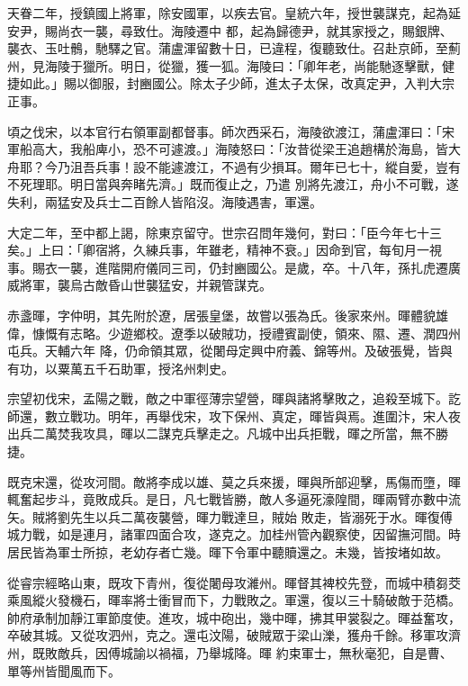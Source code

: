 \begin{pinyinscope}
 天眷二年，授鎮國上將軍，除安國軍，以疾去官。皇統六年，授世襲謀克，起為延安尹，賜尚衣一襲，尋致仕。海陵遷中
 都，起為歸德尹，就其家授之，賜銀牌、襲衣、玉吐鶻，馳驛之官。蒲盧渾留數十日，已違程，復聽致仕。召赴京師，至薊州，見海陵于獵所。明日，從獵，獲一狐。海陵曰：「卿年老，尚能馳逐擊獸，健捷如此。」賜以御服，封豳國公。除太子少師，進太子太保，改真定尹，入判大宗正事。



 頃之伐宋，以本官行右領軍副都督事。師次西采石，海陵欲渡江，蒲盧渾曰：「宋軍船高大，我船庳小，恐不可遽渡。」海陵怒曰：「汝昔從梁王追趙構於海島，皆大舟耶？今乃沮吾兵事！設不能遽渡江，不過有少損耳。爾年已七十，縱自愛，豈有不死理耶。明日當與奔睹先濟。」既而復止之，乃遣
 別將先渡江，舟小不可戰，遂失利，兩猛安及兵士二百餘人皆陷沒。海陵遇害，軍還。



 大定二年，至中都上謁，除東京留守。世宗召問年幾何，對曰：「臣今年七十三矣。」上曰：「卿宿將，久練兵事，年雖老，精神不衰。」因命到官，每旬月一視事。賜衣一襲，進階開府儀同三司，仍封豳國公。是歲，卒。十八年，孫扎虎遷廣威將軍，襲烏古敵昏山世襲猛安，并親管謀克。



 赤盞暉，字仲明，其先附於遼，居張皇堡，故嘗以張為氏。後家來州。暉體貌雄偉，慷慨有志略。少遊鄉校。遼季以破賊功，授禮賓副使，領來、隰、遷、潤四州屯兵。天輔六年
 降，仍命領其眾，從闍母定興中府義、錦等州。及破張覺，皆與有功，以粟萬五千石助軍，授洺州刺史。



 宗望初伐宋，孟陽之戰，敵之中軍徑薄宗望營，暉與諸將擊敗之，追殺至城下。訖師還，數立戰功。明年，再舉伐宋，攻下保州、真定，暉皆與焉。進圍汴，宋人夜出兵二萬焚我攻具，暉以二謀克兵擊走之。凡城中出兵拒戰，暉之所當，無不勝捷。



 既克宋還，從攻河間。敵將李成以雄、莫之兵來援，暉與所部迎擊，馬傷而墮，暉輒奮起步斗，竟敗成兵。是日，凡七戰皆勝，敵人多逼死濠隍間，暉兩臂亦數中流矢。賊將劉先生以兵二萬夜襲營，暉力戰達旦，賊始
 敗走，皆溺死于水。暉復傅城力戰，如是連月，諸軍四面合攻，遂克之。加桂州管內觀察使，因留撫河間。時居民皆為軍士所掠，老幼存者亡幾。暉下令軍中聽贖還之。未幾，皆按堵如故。



 從睿宗經略山東，既攻下青州，復從闍母攻濰州。暉督其裨校先登，而城中積芻茭乘風縱火發機石，暉率將士衝冒而下，力戰敗之。軍還，復以三十騎破敵于范橋。帥府承制加靜江軍節度使。進攻，城中砲出，幾中暉，拂其甲裳裂之。暉益奮攻，卒破其城。又從攻泗州，克之。還屯汶陽，破賊眾于梁山濼，獲舟千餘。移軍攻濟州，既敗敵兵，因傅城諭以禍福，乃舉城降。暉
 約束軍士，無秋毫犯，自是曹、單等州皆聞風而下。




\end{pinyinscope}
